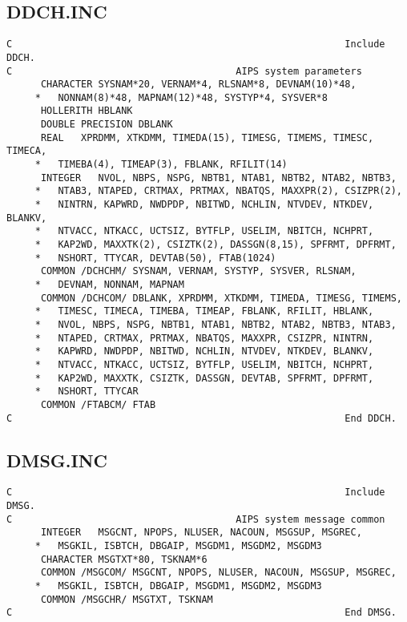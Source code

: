 \subsection{DDCH.INC}
\begin{verbatim}
C                                                          Include DDCH.
C                                       AIPS system parameters
      CHARACTER SYSNAM*20, VERNAM*4, RLSNAM*8, DEVNAM(10)*48,
     *   NONNAM(8)*48, MAPNAM(12)*48, SYSTYP*4, SYSVER*8
      HOLLERITH HBLANK
      DOUBLE PRECISION DBLANK
      REAL   XPRDMM, XTKDMM, TIMEDA(15), TIMESG, TIMEMS, TIMESC, TIMECA,
     *   TIMEBA(4), TIMEAP(3), FBLANK, RFILIT(14)
      INTEGER   NVOL, NBPS, NSPG, NBTB1, NTAB1, NBTB2, NTAB2, NBTB3,
     *   NTAB3, NTAPED, CRTMAX, PRTMAX, NBATQS, MAXXPR(2), CSIZPR(2),
     *   NINTRN, KAPWRD, NWDPDP, NBITWD, NCHLIN, NTVDEV, NTKDEV, BLANKV,
     *   NTVACC, NTKACC, UCTSIZ, BYTFLP, USELIM, NBITCH, NCHPRT,
     *   KAP2WD, MAXXTK(2), CSIZTK(2), DASSGN(8,15), SPFRMT, DPFRMT,
     *   NSHORT, TTYCAR, DEVTAB(50), FTAB(1024)
      COMMON /DCHCHM/ SYSNAM, VERNAM, SYSTYP, SYSVER, RLSNAM,
     *   DEVNAM, NONNAM, MAPNAM
      COMMON /DCHCOM/ DBLANK, XPRDMM, XTKDMM, TIMEDA, TIMESG, TIMEMS,
     *   TIMESC, TIMECA, TIMEBA, TIMEAP, FBLANK, RFILIT, HBLANK,
     *   NVOL, NBPS, NSPG, NBTB1, NTAB1, NBTB2, NTAB2, NBTB3, NTAB3,
     *   NTAPED, CRTMAX, PRTMAX, NBATQS, MAXXPR, CSIZPR, NINTRN,
     *   KAPWRD, NWDPDP, NBITWD, NCHLIN, NTVDEV, NTKDEV, BLANKV,
     *   NTVACC, NTKACC, UCTSIZ, BYTFLP, USELIM, NBITCH, NCHPRT,
     *   KAP2WD, MAXXTK, CSIZTK, DASSGN, DEVTAB, SPFRMT, DPFRMT,
     *   NSHORT, TTYCAR
      COMMON /FTABCM/ FTAB
C                                                          End DDCH.
\end{verbatim}
\subsection{DMSG.INC}
\begin{verbatim}
C                                                          Include DMSG.
C                                       AIPS system message common
      INTEGER   MSGCNT, NPOPS, NLUSER, NACOUN, MSGSUP, MSGREC,
     *   MSGKIL, ISBTCH, DBGAIP, MSGDM1, MSGDM2, MSGDM3
      CHARACTER MSGTXT*80, TSKNAM*6
      COMMON /MSGCOM/ MSGCNT, NPOPS, NLUSER, NACOUN, MSGSUP, MSGREC,
     *   MSGKIL, ISBTCH, DBGAIP, MSGDM1, MSGDM2, MSGDM3
      COMMON /MSGCHR/ MSGTXT, TSKNAM
C                                                          End DMSG.
\end{verbatim}
